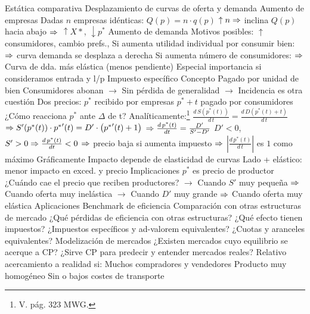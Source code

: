 \documentclass{nuevotema}
\begin{document}
\begin{esquemal}
		\2 Estática comparativa
			\3 Desplazamiento de curvas de oferta y demanda
				\4 {Aumento de empresas}
				\4[] Dadas $n$ empresas idénticas: $Q(p) = n \cdot q(p)$
				\4[] $\uparrow n \Rightarrow$ inclina $Q(p)$ hacia abajo
				\4[] $\Rightarrow$ $\uparrow X*$, $\downarrow p^*$
				\4[] 
				\4 {Aumento de demanda}
				\4[] Motivos posibles: $\uparrow$ consumidores, cambio prefs., \textellipsis
				\4[] Si aumenta utilidad individual por consumir bien:
				\4[] $\Rightarrow$ curva demanda se desplaza a derecha
				\4[] 
				\4[] Si aumenta número de consumidores:
				\4[] $\Rightarrow$ Curva de dda. más elástica (menos pendiente)
				\4[] Especial importancia si consideramos entrada y l/p
			\3 Impuesto específico
				\4 Concepto
				\4[] Pagado por unidad de bien
				\4[] Consumidores abonan
				\4[] $\to$ Sin pérdida de generalidad
				\4[] $\to$ Incidencia es otra cuestión
				\4 Dos precios:
				\4[] $p^*$ recibido por empresas
				\4[] $p^* + t$ pagado por consumidores
				\4 ¿Cómo reacciona $p^*$ ante $\varDelta$ de t?
				\4 Analíticamente:\footnote{V. pág. 323 MWG.}
				\4[] $\frac{d \, S\left( p^*(t) \right)}{d \, t} =  \frac{d \, D \left( p^*(t) + t \right)}{d \, t}$
				\4[] $\Rightarrow S'(p^*(t)) \cdot {p^*}'(t) = D' \cdot \left({p^*}'(t) + 1 \right) $
				\4[] $\Rightarrow \frac{d \, {p^*}(t)}{d t} =  \frac{D'}{S' - D'}$
				\4[] $D'<0$, $S'>0 \Rightarrow \frac{d \, {p^*}(t)}{d t} < 0 $
				\4[] $\Rightarrow$ precio baja si aumenta impuesto
				\4[] $\Rightarrow$ $\left| \frac{d \, p^*(t)}{d \, t} \right|$ es $1$ como máximo
				\4 Gráficamente
				\4[] Impacto depende de elasticidad de curvas
				\4[] Lado + elástico: menor impacto en exced. y precio
				\4[] 
				\4 Implicaciones
				\4[] $p^*$ es precio de productor
				\4[] ¿Cuándo cae el precio que reciben productores?
				\4[] $\to$ Cuando $S'$ muy pequeña
				\4[] $\Rightarrow$ Cuando oferta muy inelástica
				\4[] $\to$ Cuando $D'$ muy grande
				\4[] $\Rightarrow$ Cuando oferta muy elástica
		\2 Aplicaciones
			\3 Benchmark de eficiencia
				\4 Comparación con otras estructuras de mercado
				\4 ¿Qué pérdidas de eficiencia con otras estructuras?
				\4 ¿Qué efecto tienen impuestos?
				\4 ¿Impuestos específicos y ad-valorem equivalentes?
				\4 ¿Cuotas y aranceles equivalentes?
			\3 Modelización de mercados
				\4 ¿Existen mercados cuyo equilibrio se acerque a CP?
				\4 ¿Sirve CP para predecir y entender mercados reales?
				\4 Relativo acercamiento a realidad si:
				\4[] Muchos compradores y vendedores
				\4[] Producto muy homogéneo
				\4[] Sin o bajos costes de transporte

\end{esquemal}
\end{document}
